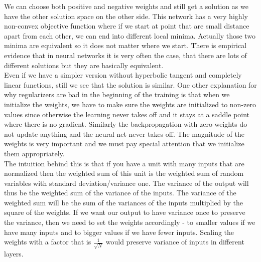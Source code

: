 We can choose both positive and negative weights and still get a solution as we have the other solution space on the other side. 
This network has a very highly non-convex objective function where if we start at point that are small distance apart from each other, we can end into different local minima. 
Actually those two minima are equivalent so it does not matter where we start. 
There is empirical evidence that in neural networks it is very often the case, that there are lots of different solutions but they are basically equivalent. \\

Even if we have a simpler version without hyperbolic tangent and completely linear functions, still we see that the solution is similar. 
One other explanation for why regularizers are bad in the beginning of the training is that when we initialize the weights, we have to make sure the weights are initialized to non-zero values since otherwise the learning never takes off and it stays at a saddle point where there is no gradient.
Similarly the backpropagation with zero weights do not update anything and the neural net never takes off. 
The magnitude of the weights is very important and we must pay special attention that we initialize them appropriately.\\

The intuition behind this is that if you have a unit with many inputs that are normalized then the weighted sum of this unit is the weighted sum of random variables with standard deviation/variance one.
The variance of the output will thus be the weighted sum of the variance of the inputs. 
The variance of the weighted sum will be the sum of the variances of the inputs multiplied by the square of the weights. 
If we want our output to have variance once to preserve the variance, then we need to set the weights accordingly - to smaller values if we have many inputs and to bigger values if we have fewer inputs.
Scaling the weights with a factor that is $\frac{1}{\sqrt{N}}$ would preserve variance of inputs in different layers. 

